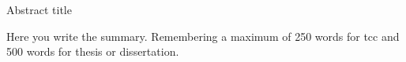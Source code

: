 \documentclass{article}
\begin{document}
\begin{englishabstract}
{Abstract title}
\ %
\ %
\ %


Here you write the summary. Remembering a maximum of 250 words for tcc and 500 words for thesis or dissertation.

\end{englishabstract}







\end{document}
